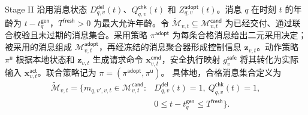 \documentclass[10pt,a4paper,twocolumn]{article}
\begin{document}
Stage II 沿用消息状态 $D_{q,v}^{\mathsf{del}}(t)$、$Q_{q,v}^{\mathsf{chk}}(t)$ 和 $Z_{q,v}^{\mathsf{adopt}}(t)$。消息 $q$ 在时刻 $t$ 的年龄为 $t-t_q^{\mathsf{gen}}$，$T^{\mathsf{fresh}}>0$ 为最大允许年龄。令 $\widetilde{\mathcal M}_{v,t}\subseteq\mathcal M_{v,t}^{\mathsf{cand}}$ 为已经交付、通过联合校验且未过期的消息集合。采用策略 $\pi^{\mathsf{adopt}}$ 为每条合格消息给出二元采用决定；被采用的消息组成 $\mathcal M_{v,t}^{\mathsf{adopt}}$，再经冻结的消息聚合器形成控制信息 $\bm z_{v,t}$。动作策略 $\pi^{\mathsf u}$ 根据本地状态和 $\bm z_{v,t}$ 生成请求命令 $\bm x_{v,t}^{\mathsf{cmd}}$，安全执行映射 $g_v^{\mathsf{safe}}$ 将其转化为实际输入 $\bm x_{v,t}^{\mathsf{act}}$。联合策略记为 $\pi=(\pi^{\mathsf{adopt}},\pi^{\mathsf u})$。
具体地，合格消息集合定义为
\begin{equation*}
\begin{aligned}
\widetilde{\mathcal M}_{v,t}=\{m_{q,v',v,t}\in \mathcal M_{v,t}^{\mathsf{cand}}:
&D_{q,v}^{\mathsf{del}}(t)=1,\ Q_{q,v}^{\mathsf{chk}}(t)=1,\\
&0\leq t-t_q^{\mathsf{gen}}\leq T^{\mathsf{fresh}}\}.
\end{aligned}
\end{equation*}
\end{document}

